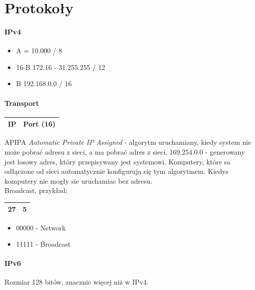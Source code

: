 \documentclass[a4paper,twoside]{article}
\begin{document}
	
\part{Protokoły}
\subsection{IPv4}

\begin{itemize}
	\item A = 10.000 / 8
	\item 16-B 172.16 - 31.255.255 / 12
	\item B 192.168.0.0 / 16
\end{itemize}
\subsection{Transport}
\begin{table}[h]
	\begin{tabular}{|c|c|}
		\hline
		IP	&	Port (16)	\\ \hline
	\end{tabular}
\end{table}
APIPA \emph{Automatic Private IP Assigned} - algorytm uruchamiany, kiedy system nie może pobrać adresu z sieci, a ma pobrać adres z sieci.
169.254.0.0 - generowany jest losowy adres, który przepisywany jest systemowi. Komputery, które sa odłączone od sieci automatycznie konfigurują się tym algorytmem. Kiedys komputery nie mogły sie uruchamiac bez adresu.\\
Broadcast, przykład:
\begin{table}[h]
	\begin{tabular}{|c|c|}
		\hline
		27	&	5	\\ \hline
	\end{tabular}
\end{table}
\begin{itemize}
	\item 00000 - Network
	\item 11111 - Broadcast
\end{itemize}



\subsection{IPv6}
Rozmiar 128 bitów, znacznie więcej niż w IPv4.
\end{document}

